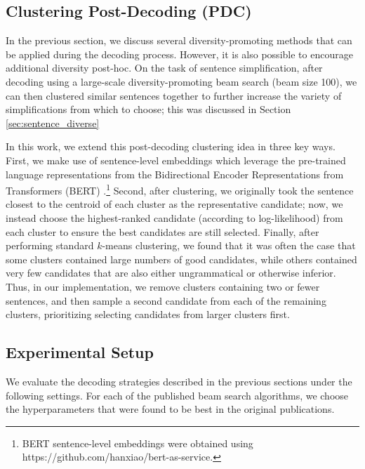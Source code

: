 \documentclass[thesis.tex]{subfiles}
\begin{document}
\subsection{Clustering Post-Decoding (PDC)} \label{sec:decoding_cluster}

In the previous section, we discuss several diversity-promoting methods that can be applied during the decoding process. However, it is also possible to encourage additional diversity post-hoc. On the task of sentence simplification, after decoding using a large-scale diversity-promoting beam search (beam size 100), we can then clustered similar sentences together to further increase the variety of simplifications from which to choose; this was discussed in Section \ref{sec:sentence_diverse}

In this work, we extend this post-decoding clustering idea in three key ways. First, we make use of sentence-level embeddings which leverage the pre-trained language representations from the Bidirectional Encoder Representations from Transformers (BERT) \citep{devlin2019bert}.\footnote{BERT sentence-level embeddings were obtained using https://github.com/hanxiao/bert-as-service.} Second, after clustering, we originally took the sentence closest to the centroid of each cluster as the representative candidate; now, we instead choose the highest-ranked candidate (according to log-likelihood) from each cluster to ensure the best candidates are still selected. Finally, after performing standard $k$-means clustering, we found that it was often the case that some clusters contained large numbers of good candidates, while others contained very few candidates that are also either ungrammatical or otherwise inferior. Thus, in our implementation, we remove clusters containing two or fewer sentences, and then sample a second candidate from each of the remaining clusters, prioritizing selecting candidates from larger clusters first.

\subsection{Experimental Setup} 

We evaluate the decoding strategies described in the previous sections under the following settings.
For each of the published beam search algorithms, we choose the hyperparameters that were found to be best in the original publications.
\end{document}
